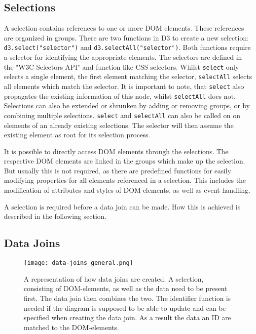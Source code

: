 \subsection{Selections}

A selection contains references to one or more DOM elements. These references are organized in groups. There are two functions in D3 to create a new selection: \verb|d3.select("selector")| and \verb|d3.selectAll("selector")|. Both functions require a selector for identifying the appropriate elements. The selectors are defined in the "W3C Selectors API" \cite{w3c_selectors_api} and function like CSS selectors. Whilst \verb|select| only selects a single element, the first element matching the selector, \verb|selectAll| selects all elements which match the selector. It is important to note, that \verb|select| also propagates the existing information of this node, whilst \verb|selectAll| does not. Selections can also be extended or shrunken by adding or removing groups, or by combining multiple selections. \verb|select| and \verb|selectAll| can also be called on on elements of an already existing selections. The selector will then assume the existing element as root for its selection process.

It is possible to directly access DOM elements through the selections. The respective DOM elements are linked in the groups which make up the selection. But usually this is not required, as there are predefined functions for easily modifying properties for all elements referenced in a selection. This includes the modification of attributes and styles of DOM-elements, as well as event handling.

A selection is required before a data join can be made. How this is achieved is described in the following section.


\subsection{Data Joins}

\begin{figure}[h]
    \texttt{[image: data-joins\_general.png]}
    \captionsetup{width=0.9\textwidth}
    \caption[data-joins]{A representation of how data joins are created. A selection, consisting of DOM-elements, as well as the data need to be present first. The data join then combines the two. The identifier function is needed if the diagram is supposed to be able to update and can be specified when creating the data join. As a result the data an ID are matched to the DOM-elements.}
    \label{fig:data-joins}
\end{figure}

